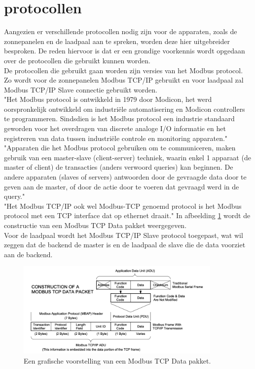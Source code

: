 \section{protocollen}
\label{sec:stand-van-zaken-protocollen}

Aangezien er verschillende protocollen nodig zijn voor de apparaten, zoals de zonnepanelen en de laadpaal aan te spreken, worden deze hier uitgebreider besproken. De reden hiervoor is dat er een grondige voorkennis wordt opgedaan over de protocollen die gebruikt kunnen worden.\\

De protocollen die gebruikt gaan worden zijn versies van het Modbus protocol. Zo wordt voor de zonnepanelen Modbus TCP/IP gebruikt en voor laadpaal zal Modbus TCP/IP Slave connectie gebruikt worden.\\

"Het Modbus protocol is ontwikkeld in 1979 door Modicon, het werd oorspronkelijk ontwikkeld om industriële automatisering en Modicon controllers te programmeren. Sindsdien is het Modbus protocol een industrie standaard geworden voor het overdragen van discrete analoge I/O informatie en het registreren van data tussen industriële controle en monitoring apparaten." \autocite{Acromag2005} \\

"Apparaten die het Modbus protocol gebruiken om te communiceren, maken gebruik van een master-slave (client-server) techniek, waarin enkel 1 apparaat (de master of client) de transacties (anders verwoord queries) kan beginnen. De andere apparaten (slaves of servers) antwoorden door de gevraagde data door te geven aan de master, of door de actie door te voeren dat gevraagd werd in de query." \autocite{Acromag2005} \\

"Het Modbus TCP/IP ook wel Modbus-TCP genoemd protocol is het Modbus protocol met een TCP interface dat op ethernet draait." \autocite{Acromag2005} In afbeelding \ref{fig:modbus-data-pakket} wordt de constructie van een Modbus TCP Data pakket weergegeven.\\

Voor de laadpaal wordt het Modbus TCP/IP Slave protocol toegepast, wat wil zeggen dat de backend de master is en de laadpaal de slave die de data voorziet aan de backend.

\begin{figure}[h]
    \includegraphics[width=10cm]{./graphics/Modbus-TCP-schema.png}
    \caption{Een grafische voorstelling van een Modbus TCP Data pakket. \autocite{Acromag2005}}
    \label{fig:modbus-data-pakket}
\end{figure}

